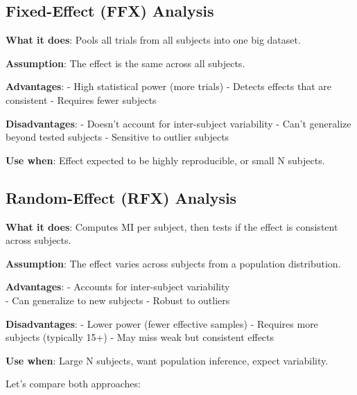 \documentclass[
  11pt,
  letterpaper,
  oneside,
  openany]{book}
\begin{document}
\subsection{Fixed-Effect (FFX)
Analysis}\label{fixed-effect-ffx-analysis}

\textbf{What it does}: Pools all trials from all subjects into one big
dataset.

\textbf{Assumption}: The effect is the same across all subjects.

\textbf{Advantages}: - High statistical power (more trials) - Detects
effects that are consistent - Requires fewer subjects

\textbf{Disadvantages}: - Doesn't account for inter-subject variability
- Can't generalize beyond tested subjects - Sensitive to outlier
subjects

\textbf{Use when}: Effect expected to be highly reproducible, or small N
subjects.

\subsection{Random-Effect (RFX)
Analysis}\label{random-effect-rfx-analysis}

\textbf{What it does}: Computes MI per subject, then tests if the effect
is consistent across subjects.

\textbf{Assumption}: The effect varies across subjects from a population
distribution.

\textbf{Advantages}: - Accounts for inter-subject variability\\
- Can generalize to new subjects - Robust to outliers

\textbf{Disadvantages}: - Lower power (fewer effective samples) -
Requires more subjects (typically 15+) - May miss weak but consistent
effects

\textbf{Use when}: Large N subjects, want population inference, expect
variability.

Let's compare both approaches:
\end{document}
